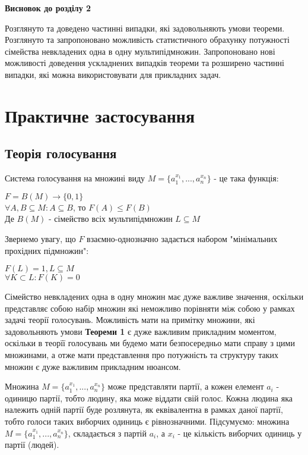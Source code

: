\textbf{Висновок до розділу 2}

	Розглянуто та доведено частинні випадки, які задовольняють умови теореми. Розглянуто та запропоновано можливість статистичного обрахунку потужності сімейства невкладених одна в одну мультипідмножин. Запропоновано нові можливості доведення ускладнених випадків теореми та розширено частинні випадки, які можна використовувати для прикладних задач.
\newpage

\chapter{Практичне застосування}

\section{Теорія голосування}
Система голосування на множині виду $M = \{a_1^{x_1}, ... , a_n^{x_n}\}$ - це така функція:

\begin{center}
$F = B(M) \rightarrow \{0,1\}$
\\
$ \forall A, B \subseteq M: A \subseteq B$, то $F(A) \leq F(B)$ 
\\
Де $B(M)$ - сімейство всіх мультипідмножин $L \subseteq M$
\end{center}

Звернемо увагу, що $F$ взаємно-однозначно задається набором "мінімальних прохідних підмножин":

\begin{center}
$F(L) = 1, L \subseteq M $
\\
$ \forall K \subset L: F(K) = 0$ 
\end{center}

Сімейство невкладених одна в одну множин має дуже важливе значення, оскільки представляє собою набір множин які неможливо порівняти між собою у рамках задачі теорії голосувань. Можливість мати на примітку множини, які задовольняють умови {\bf Теореми 1} є дуже важливим прикладним моментом, оскільки в теорїї голосувань ми будемо мати безпосередньо мати справу з цими множинами, а отже мати представлення про потужність та структуру таких множин є дуже важливим прикладним нюансом.

Множина $M = \{a_1^{x_1}, ... , a_n^{x_n}\}$ може представляти партії, а кожен елемент $a_i$ - одиницю партії, тобто людину, яка може віддати свій голос. Кожна людина яка належить одній партії буде розлянута, як еквівалентна в рамках даної партії, тобто голоси таких виборчих одиниць є рівнозначними. Підсумуємо: множина $M = \{a_1^{x_1}, ... , a_n^{x_n}\}$, складається з партій $a_i$, а $x_i$ - це кількість виборчих одиниць у партії (людей).


